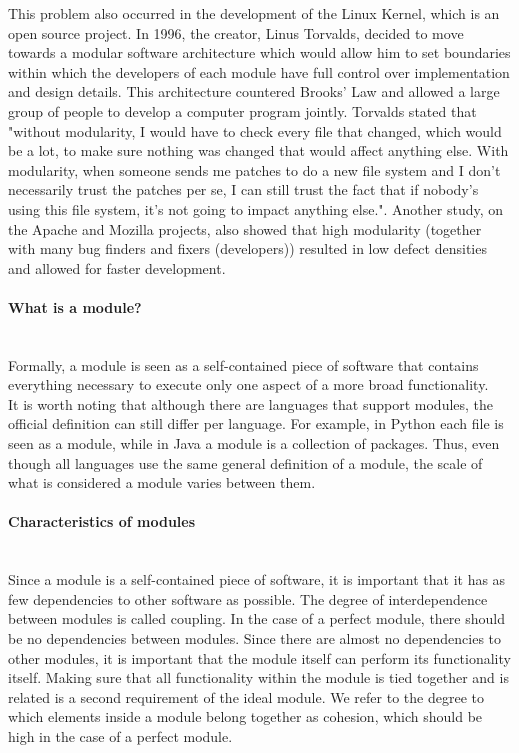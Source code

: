 \documentclass[twoside]{uva-inf-bachelor-thesis}
\newcommand{\myparagraph}[1]{\paragraph{#1}\mbox{}\\}
\begin{document}
This problem also occurred in the development of the Linux Kernel, which is an open source project\cite{LinuxKernel}. In 1996, the creator, Linus Torvalds, decided to move towards a modular software architecture which would allow him to set boundaries within which the developers of each module have full control over implementation and design details. This architecture countered Brooks' Law and allowed a large group of people to develop a computer program jointly. Torvalds stated that "without modularity, I would have to check every file that changed, which would be a lot, to make sure nothing was changed that would affect anything else. With modularity, when someone sends me patches to do a new file system and I don't necessarily trust the patches per se, I can still trust the fact that if nobody's using this file system, it's not going to impact anything else."\cite{lee2000linux}. Another study, on the Apache and Mozilla projects, also showed that high modularity (together with many bug finders and fixers (developers)) resulted in low defect densities and allowed for faster development\cite{mockus2002two}.\\

\myparagraph{What is a module?}
\label{paragraph:module-definition}
Formally, a module is seen as a self-contained piece of software that contains everything necessary to execute only one aspect of a more broad functionality.\\

It is worth noting that although there are languages that support modules, the official definition can still differ per language. For example, in Python each file is seen as a module\cite{pythonmodules}, while in Java a module is a collection of packages\cite{javamodules}. Thus, even though all languages use the same general definition of a module, the scale of what is considered a module varies between them.

\myparagraph{Characteristics of modules}
Since a module is a self-contained piece of software, it is important that it has as few dependencies to other software as possible. The degree of interdependence between modules is called coupling\cite{ISO24765}. In the case of a perfect module, there should be no dependencies between modules. Since there are almost no dependencies to other modules, it is important that the module itself can perform its functionality itself. Making sure that all functionality within the module is tied together and is related is a second requirement of the ideal module. We refer to the degree to which elements inside a module belong together as cohesion\cite{yourdon1979structured}, which should be high in the case of a perfect module.\\
\end{document}
